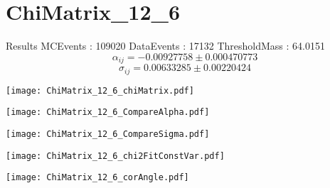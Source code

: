 \documentclass[a4paper,12pt]{article}
\begin{document}
\section{ChiMatrix\_12\_6}
\begin{minipage}{0.49\linewidth} Results \newline
MCEvents : 109020\newline
DataEvents : 17132 \newline
ThresholdMass : 64.0151\\
$$\alpha_{ij} = -0.00927758\pm 0.000470773$$
$$\sigma_{ij} = 0.00633285\pm 0.00220424$$
\end{minipage}\hfill
\begin{minipage}{0.49\linewidth} 
\texttt{[image: ChiMatrix\_12\_6\_chiMatrix.pdf]}\\
\end{minipage}
\hfill
\begin{minipage}{0.49\linewidth} 
\texttt{[image: ChiMatrix\_12\_6\_CompareAlpha.pdf]}\\
\end{minipage}
\hfill
\begin{minipage}{0.49\linewidth} 
\texttt{[image: ChiMatrix\_12\_6\_CompareSigma.pdf]}\\
\end{minipage}
\begin{minipage}{0.49\linewidth} 
\texttt{[image: ChiMatrix\_12\_6\_chi2FitConstVar.pdf]}\\
\end{minipage}
\hfill
\begin{minipage}{0.49\linewidth} 
\texttt{[image: ChiMatrix\_12\_6\_corAngle.pdf]}\\
\end{minipage}
\end{document}
